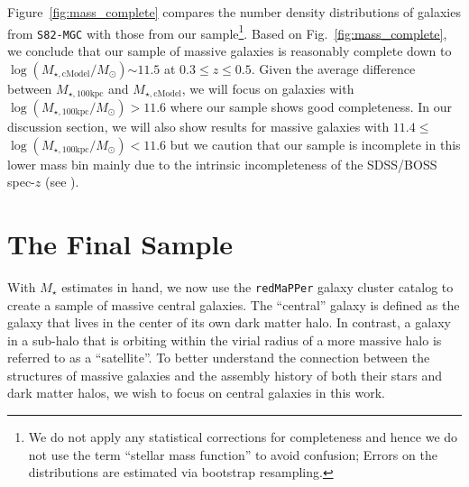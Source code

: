 \documentclass[a4paper,fleqn,usenatbib]{mnras}
\def\redm{\texttt{redMaPPer}}
\def\rbcg{\texttt{cenHighMh}}
\def\nbcg{\texttt{cenLowMh}}
\def\mstar{{$M_{\star}$}}
\def\mtot{{$M_{\star,100\mathrm{kpc}}$}}
\def\mcmodel{{$M_{\star,\mathrm{cModel}}$}}
\def\logmtot{{$\log (M_{\star,100\mathrm{kpc}}/M_{\odot})$}}
\def\logmcmodel{{$\log (M_{\star,\mathrm{cModel}}/M_{\odot})$}}
\begin{document}
    Figure~\ref{fig:mass_complete} compares the number density distributions of 
    galaxies from \texttt{S82-MGC} with those from our sample\footnote{We do not 
    apply any statistical corrections for completeness and hence we do not use the 
    term ``stellar mass function'' to avoid confusion;
    Errors on the distributions are estimated via bootstrap resampling.}. 
    Based on Fig.~\ref{fig:mass_complete}, we conclude that our sample of massive 
    galaxies is reasonably complete down to \logmcmodel{}${\sim} 11.5$ at 
    $0.3 \leq z \leq 0.5$. 
    Given the average difference between \mtot{} and \mcmodel{}, we will focus on 
    galaxies with \logmtot{}$> 11.6$ where our sample shows good completeness. 
    In our discussion section, we will also show results for massive galaxies 
    with $11.4 \le$\logmtot{}$<11.6$ but we caution that our sample is incomplete 
    in this lower mass bin mainly due to the intrinsic incompleteness of the 
    SDSS/BOSS spec-$z$ (see \citealt{Leauthaud2016}).

    

\section{The Final Sample}
    \label{sec:final}
    
	With \mstar{} estimates in hand, we now use the \redm{} galaxy cluster catalog to  
	create a sample of massive central galaxies. 
	The ``central'' galaxy is defined as the galaxy that lives in the 
	center of its own dark matter halo.  
	In contrast, a galaxy in a sub-halo that is orbiting within the virial radius of a 
	more massive halo is referred to as a ``satellite''. 
	To better understand the connection between the structures of massive 
	galaxies and the assembly history of both their stars and dark matter halos, we 
	wish to focus on central galaxies in this work. 
    
\end{document}
